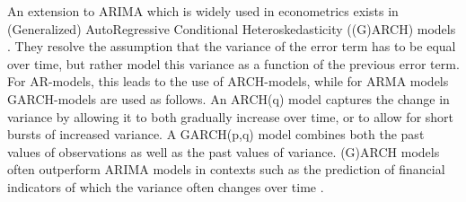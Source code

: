 An extension to ARIMA which is widely used in econometrics exists in (Generalized) AutoRegressive Conditional Heteroskedasticity ((G)ARCH) models \cite{francq2019garch}.
They resolve the assumption that the variance of the error term has to be equal over time, but rather model this variance as a function of the previous error term.
For AR-models, this leads to the use of ARCH-models, while for ARMA models GARCH-models are used as follows.
An ARCH(q) model captures the change in variance by allowing it to both gradually increase over time, or to allow for short bursts of increased variance.
A GARCH(p,q) model combines both the past values of observations as well as the past values of variance.
(G)ARCH models often outperform ARIMA models in contexts such as the prediction of financial indicators of which the variance often changes over time \cite{francq2019garch}.